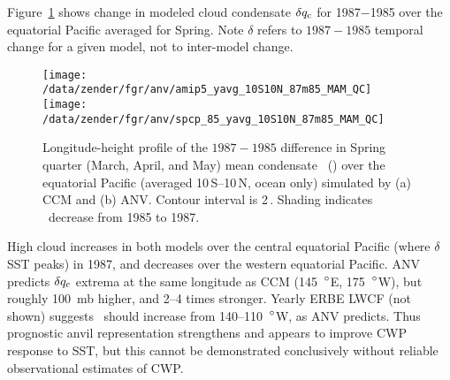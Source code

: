 \documentclass[twoside,agupp]{aguplus}
\begin{document}
Figure~\ref{fig:yavg_10S10N_87m85_MAM_QC} shows change in modeled
cloud condensate $\delta \mbox{$q_\mathrm{c}$}$ for 1987$-$1985 over the equatorial
Pacific averaged for Spring. 
Note $\delta$ refers to $1987 - 1985$ temporal change for a given
model, not to inter-model change. 
\begin{figure}
\begin{center}
\texttt{[image: /data/zender/fgr/anv/amip5\_yavg\_10S10N\_87m85\_MAM\_QC]}\vfill
\texttt{[image: /data/zender/fgr/anv/spcp\_85\_yavg\_10S10N\_87m85\_MAM\_QC]}\vfill
\end{center}
\caption[Longitude-height profile of the $1987-1985$ difference in
Spring quarter (March, April, and May) mean condensate \qc\ over the
equatorial Pacific simulated by CCM and ANV]{
Longitude-height profile of the $1987-1985$ difference in Spring
quarter (March, April, and May) mean condensate \qc\ (\mgxkg) over the
equatorial Pacific (averaged 10\,\dgr S--10\,\dgr N, 
ocean only) simulated by (a) CCM and (b) ANV.
Contour interval is 2\,\mgxkg.
Shading indicates \qc\ decrease from 1985 to 1987.
\label{fig:yavg_10S10N_87m85_MAM_QC}}   
\end{figure}
High cloud increases in both models over the central equatorial
Pacific (where $\delta$SST peaks) in 1987, and decreases over the
western equatorial Pacific.
ANV predicts $\delta \mbox{$q_\mathrm{c}$}$ extrema at the same longitude as CCM
(145~$^{\circ}$E, 175~$^{\circ}$W), but roughly 100~mb higher,
and 2--4 times stronger.
Yearly ERBE LWCF (not shown) suggests \qc\ should increase from 
140--110~$^{\circ}$W, as ANV predicts.  
Thus prognostic anvil representation strengthens and appears to improve
CWP response to SST, but this cannot be demonstrated conclusively
without reliable observational estimates of CWP.
\end{document}
